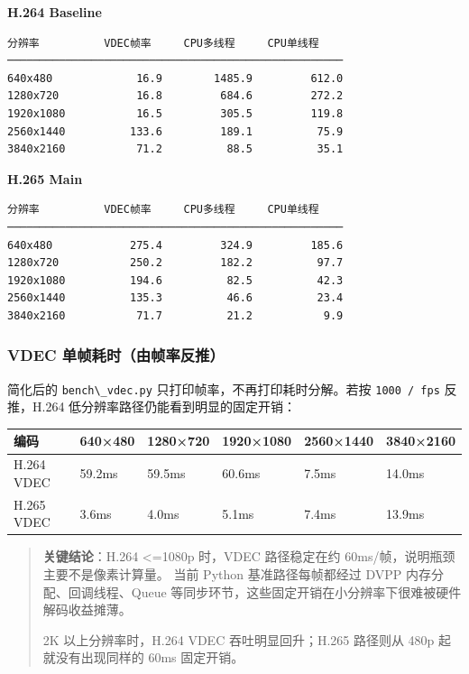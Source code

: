 \textbf{H.264 Baseline}

\begin{lstlisting}
分辨率          VDEC帧率     CPU多线程     CPU单线程
────────────────────────────────────────────────────
640x480             16.9        1485.9         612.0
1280x720            16.8         684.6         272.2
1920x1080           16.5         305.5         119.8
2560x1440          133.6         189.1          75.9
3840x2160           71.2          88.5          35.1
\end{lstlisting}

\textbf{H.265 Main}

\begin{lstlisting}
分辨率          VDEC帧率     CPU多线程     CPU单线程
────────────────────────────────────────────────────
640x480            275.4         324.9         185.6
1280x720           250.2         182.2          97.7
1920x1080          194.6          82.5          42.3
2560x1440          135.3          46.6          23.4
3840x2160           71.7          21.2           9.9
\end{lstlisting}

\subsubsection{VDEC 单帧耗时（由帧率反推）}\label{src-book-chapter6-h77}

简化后的 \passthrough{\lstinline!bench\_vdec.py!}
只打印帧率，不再打印耗时分解。若按 \passthrough{\lstinline!1000 / fps!}
反推，H.264 低分辨率路径仍能看到明显的固定开销：

\begin{longtable}[]{@{}llllll@{}}
\toprule\noalign{}
编码 & 640×480 & 1280×720 & 1920×1080 & 2560×1440 & 3840×2160 \\
\midrule\noalign{}
\endhead
\bottomrule\noalign{}
\endlastfoot
H.264 VDEC & 59.2ms & 59.5ms & 60.6ms & 7.5ms & 14.0ms \\
H.265 VDEC & 3.6ms & 4.0ms & 5.1ms & 7.4ms & 13.9ms \\
\end{longtable}

\begin{quote}
\textbf{关键结论}：H.264 \textless=1080p 时，VDEC 路径稳定在约
60ms/帧，说明瓶颈主要不是像素计算量。 当前 Python 基准路径每帧都经过
DVPP 内存分配、回调线程、Queue
等同步环节，这些固定开销在小分辨率下很难被硬件解码收益摊薄。

2K 以上分辨率时，H.264 VDEC 吞吐明显回升；H.265 路径则从 480p
起就没有出现同样的 60ms 固定开销。
\end{quote}

